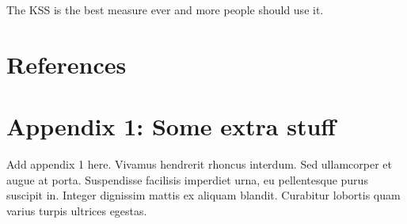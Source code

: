 \documentclass[
]{article}
\begin{document}
The KSS is the best measure ever and more people should use it.

\newpage

\footnotesize
\singlespacing
\setlength{\parindent}{0in}

\section{References}\label{references}

\newpage

\section*{Appendix 1: Some extra
stuff}\label{appendix-1-some-extra-stuff}

Add appendix 1 here. Vivamus hendrerit rhoncus interdum. Sed ullamcorper
et augue at porta. Suspendisse facilisis imperdiet urna, eu pellentesque
purus suscipit in. Integer dignissim mattis ex aliquam blandit.
Curabitur lobortis quam varius turpis ultrices egestas.

\newpage
\end{document}

